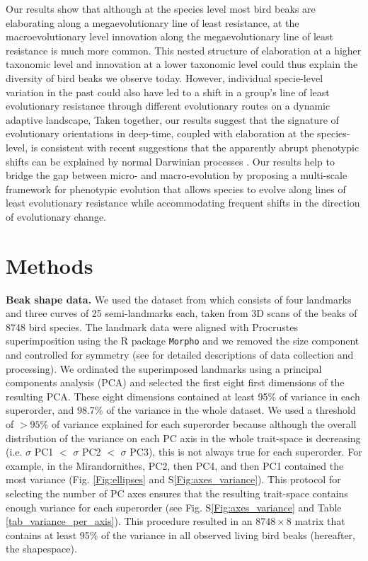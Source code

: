 \documentclass[12pt,letterpaper]{article}
\begin{document}
\bigskip

Our results show that although at the species level most bird beaks are elaborating along a megaevolutionary line of least resistance, at the macroevolutionary level innovation along the megaevolutionary line of least resistance is much more common.
This nested structure of elaboration at a higher taxonomic level and innovation at a lower taxonomic level could thus explain the diversity of bird beaks we observe today.
However, individual specie-level variation in the past could also have led to a shift in a group's line of least evolutionary resistance through different evolutionary routes on a dynamic adaptive landscape, Taken together, our results suggest that the signature of evolutionary orientations in deep-time, coupled with elaboration at the species-level, is consistent with recent suggestions that the apparently abrupt phenotypic shifts can be explained by normal Darwinian processes \cite{pagel2022general}.
Our results help to bridge the gap between micro- and macro-evolution by proposing a multi-scale framework for  phenotypic evolution that allows species to evolve along lines of least evolutionary resistance while accommodating frequent shifts in the direction of evolutionary change.

\section{Methods}


\textbf{Beak shape data.}
We used the dataset from \cite{cooney2017mega,chira2020signature,hughes2022global} which consists of four landmarks and three curves of 25 semi-landmarks each, taken from 3D scans of  the beaks of 8748 bird species.
The landmark data were aligned with Procrustes superimposition using the R package \texttt{Morpho} \cite{Rcore,Morpho} and we removed the size component and controlled for symmetry (see \cite{cooney2017mega,chira2020signature,hughes2022global} for detailed descriptions of data collection and processing).
We ordinated the superimposed landmarks using a principal components analysis (PCA) and selected the first eight first dimensions of the resulting PCA.
These eight dimensions contained at least 95\% of variance in each superorder, and 98.7\% of the variance in the whole dataset.
We used a threshold of $>95$\% of variance explained for each superorder because although the overall distribution of the variance on each PC axis in the whole trait-space is decreasing (i.e.
$\sigma$ PC1 $<$ $\sigma$ PC2 $<$ $\sigma$ PC3), this is not always true for each superorder.
For example, in the Mirandornithes, PC2, then PC4, and then PC1 contained the most variance (Fig. \ref{Fig:ellipses} and S\ref{Fig:axes_variance}).
This protocol for selecting the number of PC axes ensures that the resulting trait-space contains enough variance for each superorder (see Fig. S\ref{Fig:axes_variance} and Table \ref{tab_variance_per_axis}).
This procedure resulted in an $8748 \times 8$ matrix that contains at least 95\% of the variance in all observed living bird beaks (hereafter, the shapespace).
\end{document}
